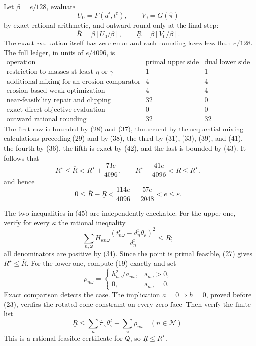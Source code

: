 Let \(\beta=e/128\), evaluate
\[
 U_0=F(d^{\mathrm r},t^{\mathrm r}),
 \qquad V_0=G(\widehat\pi)
\tag{42}
\]
by exact rational arithmetic, and outward-round only at the final step:
\[
 \overline R=\beta\left\lceil U_0/\beta\right\rceil,
 \qquad
 \underline R=\beta\left\lfloor V_0/\beta\right\rfloor.
\tag{43}
\]
The exact evaluation itself has zero error and each rounding loses less than \(e/128\).  The full ledger, in units of \(e/4096\), is
\[
\begin{array}{c|c|c}
\text{operation}&\text{primal upper side}&\text{dual lower side}\\ \hline
\text{restriction to masses at least }\eta\text{ or }\gamma&1&1\\
\text{additional mixing for an erosion comparator}&4&4\\
\text{erosion-based weak optimization}&4&4\\
\text{near-feasibility repair and clipping}&32&0\\
\text{exact direct objective evaluation}&0&0\\
\text{outward rational rounding}&32&32
\end{array}
\tag{44}
\]
The first row is bounded by (28) and (37), the second by the sequential mixing calculations preceding (29) and by (38), the third by (31), (33), (39), and (41), the fourth by (36), the fifth is exact by (42), and the last is bounded by (43).  It follows that
\[
 R^\star\le\overline R<R^\star+\frac{73e}{4096},
 \qquad
 R^\star-\frac{41e}{4096}<\underline R\le R^\star,
\tag{45}
\]
and hence
\[
 0\le\overline R-\underline R
 <\frac{114e}{4096}=\frac{57e}{2048}<e\le\varepsilon.
\tag{46}
\]

The two inequalities in (45) are independently checkable.  For the upper one, verify for every \(\kappa\) the rational inequality
\[
 \sum_{n,\omega}H_{\kappa n\omega}
 \frac{(t^{\mathrm r}_{n\omega}-d_n^{\mathrm r}\theta_\kappa)^2}
      {d_n^{\mathrm r}}
 \le\overline R;
\tag{47}
\]
all denominators are positive by (34).  Since the point is primal feasible, (27) gives \(R^\star\le\overline R\).  For the lower one, compute (19) exactly and set
\[
 \rho_{n\omega}=\begin{cases}
 h_{n\omega}^2/a_{n\omega},&a_{n\omega}>0,\\
 0,&a_{n\omega}=0.
 \end{cases}
\tag{48}
\]
Exact comparison detects the case.  The implication \(a=0\Rightarrow h=0\), proved before (23), verifies the rotated-cone constraint on every zero face.  Then verify the finite list
\[
 \underline R\le
 \sum_\kappa\widehat\pi_\kappa\theta_\kappa^2
 -\sum_\omega\rho_{n\omega}
 \quad(n\in\mathcal N).
\tag{49}
\]
This is a rational feasible certificate for \(\mathsf Q\), so \(\underline R\le R^\star\).

